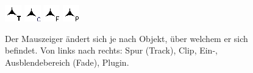 \begin{figure}[htb]
 \centering
 \includegraphics[height=2\baselineskip]{../images/cursorFloatOverTrack.png}\qquad
 \includegraphics[height=2\baselineskip]{../images/cursorFloatOverClip.png}\qquad
 \includegraphics[height=2\baselineskip]{../images/cursorFloatOverFade.png}\qquad
 \includegraphics[height=2\baselineskip]{../images/cursorFloatOverPlugin.png}
 \caption{Der Mauszeiger ändert sich je nach Objekt, über welchem er sich befindet. Von links nach rechts: Spur (Track), Clip, Ein-, Ausblendebereich (Fade), Plugin.}
 \label{fig_cursor}
\end{figure}
